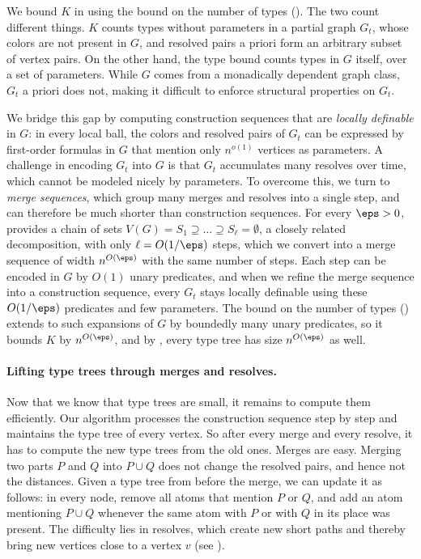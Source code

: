 We bound $K$ in  using the bound on the number of types ().
The two count different things.
$K$ counts types without parameters in a partial graph $G_t$, whose colors are not present in $G$, and resolved pairs a priori form an arbitrary subset of vertex pairs.
On the other hand, the type bound counts types in $G$ itself, over a set of parameters.
While \(G\) comes from a monadically dependent graph class, \(G_t\) a priori does not, making it difficult to enforce structural properties on \(G_t\).

We bridge this gap by computing construction sequences that are \emph{locally definable} in $G$:
in every local ball, the colors and resolved pairs of $G_t$ can be expressed by first-order formulas in $G$ that mention only $n^{o(1)}$ vertices as parameters.
A challenge in encoding $G_t$ into $G$ is that $G_t$ accumulates many resolves over time, which cannot be modeled nicely by parameters.
To overcome this, we turn to \emph{merge sequences}, which group many merges and resolves into a single step, and can therefore be much shorter than construction sequences.
For every $\eps>0$,~\cite{md-abmw} provides a chain of sets $V(G)=S_1\supseteq\dots\supseteq S_\ell=\emptyset$, a closely related decomposition, with only $\ell=O(1/\eps)$ steps, which we convert into a merge sequence of width $n^{O(\eps)}$ with the same number of steps.
Each step can be encoded in $G$ by $O(1)$ unary predicates, and when we refine the merge sequence into a construction sequence, every $G_t$ stays locally definable using these $O(1/\eps)$ predicates and few parameters.
The bound on the number of types () extends to such expansions of $G$ by boundedly many unary predicates, so it bounds $K$ by $n^{O(\eps)}$, and by , every type tree has size $n^{O(\eps)}$ as well.

\paragraph{Lifting type trees through merges and resolves.}
Now that we know that type trees are small, it remains to compute them efficiently.
Our algorithm processes the construction sequence step by step and maintains the type tree of every vertex.
So after every merge and every resolve, it has to compute the new type trees from the old ones.
Merges are easy.
Merging two parts $P$ and $Q$ into $P\cup Q$ does not change the resolved pairs, and hence not the distances.
Given a type tree from before the merge, we can update it as follows:
in every node, remove all atoms that mention $P$ or $Q$, and add an atom mentioning $P\cup Q$ whenever the same atom with $P$ or with $Q$ in its place was present.
The difficulty lies in resolves, which create new short paths and thereby bring new vertices close to a vertex $v$ (see ).

